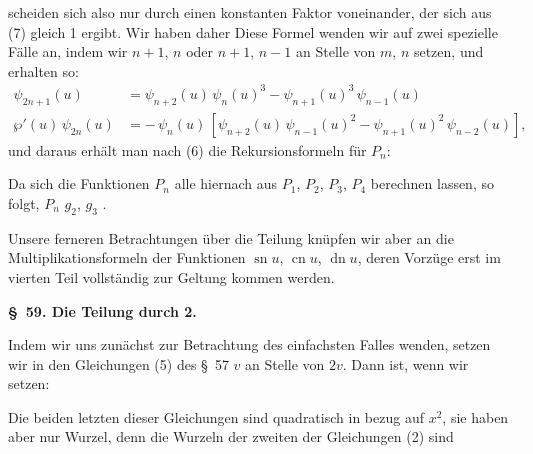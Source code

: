 scheiden sich also nur durch einen konstanten Faktor voneinander,
der sich aus (7) gleich 1 ergibt. Wir haben daher
Diese Formel wenden wir auf zwei spezielle F\"alle an, indem
wir $n+1$, $n$ oder $n+1$, $n-1$ an Stelle von $m$, $n$ setzen, und
erhalten so:
\[
\begin{aligned}
\psi_{2n+1}(u) &= \psi_{n+2}(u)\,\psi_n(u)^3 - \psi_{n+1}(u)^3\,\psi_{n-1}(u)\\
\wp'(u)\,\psi_{2n}(u) &= -\,\psi_n(u)\,[\psi_{n+2}(u)\,\psi_{n-1}(u)^2 - \psi_{n+1}(u)^2\,\psi_{n-2}(u)],
\end{aligned}
\]
und daraus erh\"alt man nach (6) die Rekursionsformeln f\"ur $P_n$:

Da sich die Funktionen $P_n$ alle hiernach aus $P_1$, $P_2$, $P_3$, $P_4$
berechnen lassen, so folgt, 
$P_n$  $g_2$, $g_3$ .

Unsere ferneren Betrachtungen \"uber die Teilung kn\"upfen
wir aber an die Multiplikationsformeln der Funktionen $\operatorname{sn} u$, $\operatorname{cn} u$,
$\operatorname{dn} u$, deren Vorz\"uge erst im vierten Teil vollst\"andig zur Geltung
kommen werden.

\begin{center}
\textbf{\S~59. Die Teilung durch 2.}
\end{center}

Indem wir uns zun\"achst zur Betrachtung des einfachsten
Falles wenden, setzen wir in den Gleichungen (5) des \S~57 $v$ an
Stelle von $2v$. Dann ist, wenn wir
setzen:

Die beiden letzten dieser Gleichungen sind quadratisch in
bezug auf $x^2$, sie haben aber nur 
Wurzel, denn die Wurzeln der zweiten der Gleichungen (2) sind
